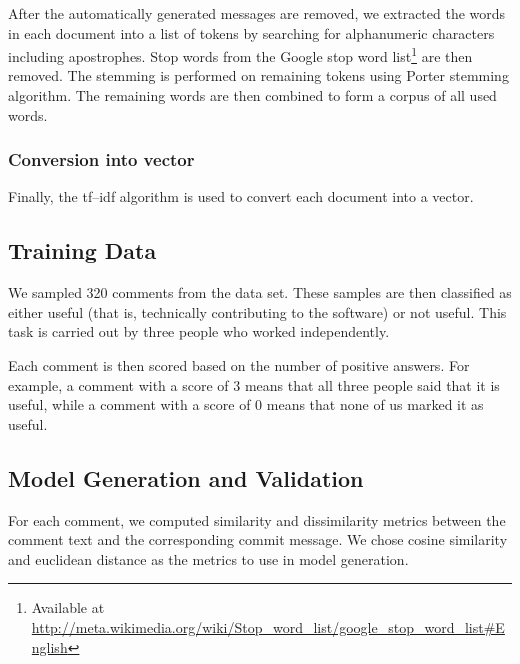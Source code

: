 \documentclass[conference]{IEEEtran}
\begin{document}
After the automatically generated messages are removed, we extracted the words in each document into a list of tokens by searching for alphanumeric characters including apostrophes.
Stop words from the Google stop word list\footnote{Available at \url{http://meta.wikimedia.org/wiki/Stop_word_list/google_stop_word_list#English}} are then removed.
The stemming is performed on remaining tokens using Porter stemming algorithm.
The remaining words are then combined to form a corpus of all used words.

\subsubsection{Conversion into vector}

Finally, the tf--idf algorithm is used to convert each document into a vector.


\subsection{Training Data}

We sampled 320 comments from the data set.
These samples are then classified as either useful (that is, technically contributing to the software) or not useful.
This task is carried out by three people who worked independently.

Each comment is then scored based on the number of positive answers.
For example, a comment with a score of 3 means that all three people said that it is useful,
while a comment with a score of 0 means that none of us marked it as useful.



\subsection{Model Generation and Validation}

For each comment, we computed similarity and dissimilarity metrics
between the comment text and the corresponding commit message.
We chose cosine similarity and euclidean distance as the metrics to use in model generation.
\end{document}
